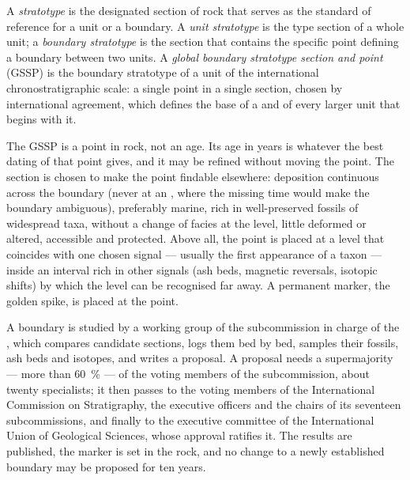 \begin{definition}\label{def:b1:stratigraphic-scale:gssp}
A \emph{stratotype} is the designated section of rock that
serves as the standard of reference for a unit or a boundary. A \emph{unit
stratotype} is the type section of a whole unit; a
\emph{boundary stratotype} is the section that
contains the specific point defining a boundary between two units. A
\emph{global boundary stratotype section and point} (GSSP) is the boundary stratotype of a
unit of the international chronostratigraphic scale: a single point in a single
section, chosen by international agreement, which defines the base of a 
and of every larger unit that begins with it.
\end{definition}

The GSSP is a point in rock, not an age. Its age in years is whatever the best
dating of that point gives, and it may be refined without moving the point. The
section is chosen to make the point findable elsewhere: deposition continuous
across the boundary (never at an , where the missing time would make
the boundary ambiguous), preferably marine, rich in well-preserved fossils of
widespread taxa, without a change of facies at the level, little deformed or
altered, accessible and protected. Above all, the point is placed at a level
that coincides with one chosen signal --- usually the first appearance of a
taxon --- inside an interval rich in other signals (ash beds, magnetic
reversals, isotopic shifts) by which the level can be recognised far away. A
permanent marker, the golden spike, is placed at the point.

\begin{inthefield}
A boundary is studied by a working group of the subcommission in charge of the
, which compares candidate sections, logs them bed by bed, samples their
fossils, ash beds and isotopes, and writes a proposal. A proposal needs a
supermajority --- more than \qty{60}{\%} --- of the voting members of the
subcommission, about twenty specialists; it then passes to the voting members of
the International Commission on Stratigraphy, the executive officers and the
chairs of its seventeen subcommissions, and finally to the executive committee of
the International Union of Geological Sciences, whose approval ratifies it. The
results are published, the marker is set in the rock, and no change to a newly
established boundary may be proposed for ten years.
\end{inthefield}

